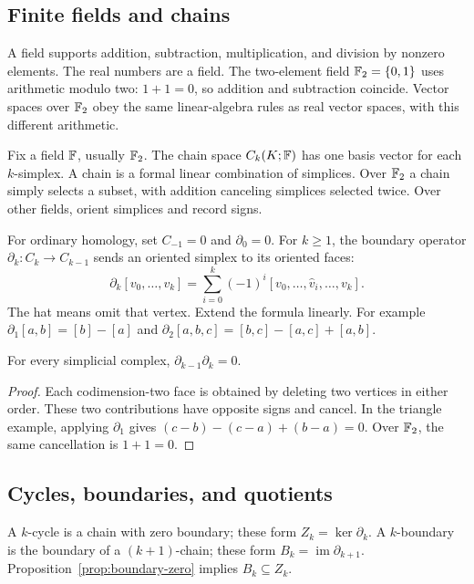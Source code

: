 \subsection{Finite fields and chains}
A field supports addition, subtraction, multiplication, and division by nonzero elements. The real numbers are a field. The two-element field $\mathbb{F}_2=\{0,1\}$ uses arithmetic modulo two: $1+1=0$, so addition and subtraction coincide. Vector spaces over $\mathbb{F}_2$ obey the same linear-algebra rules as real vector spaces, with this different arithmetic.

Fix a field $\mathbb{F}$, usually $\mathbb{F}_2$. The chain space $C_k(K;\mathbb{F})$ has one basis vector for each $k$-simplex. A chain is a formal linear combination of simplices. Over $\mathbb{F}_2$ a chain simply selects a subset, with addition canceling simplices selected twice. Over other fields, orient simplices and record signs.

For ordinary homology, set $C_{-1}=0$ and $\partial_0=0$. For $k\geq1$, the boundary operator $\partial_k:C_k\to C_{k-1}$ sends an oriented simplex to its oriented faces:
\begin{equation}\label{eq:boundary}
\partial_k[v_0,\ldots,v_k]=\sum_{i=0}^k(-1)^i[v_0,\ldots,\widehat v_i,\ldots,v_k].
\end{equation}
The hat means omit that vertex. Extend the formula linearly. For example $\partial_1[a,b]=[b]-[a]$ and $\partial_2[a,b,c]=[b,c]-[a,c]+[a,b]$.

\begin{proposition}\label{prop:boundary-zero}
For every simplicial complex, $\partial_{k-1}\partial_k=0$.
\end{proposition}
\begin{proof}
Each codimension-two face is obtained by deleting two vertices in either order. These two contributions have opposite signs and cancel. In the triangle example, applying $\partial_1$ gives $(c-b)-(c-a)+(b-a)=0$. Over $\mathbb{F}_2$, the same cancellation is $1+1=0$.
\end{proof}

\subsection{Cycles, boundaries, and quotients}
A $k$-cycle is a chain with zero boundary; these form $Z_k=\ker\partial_k$. A $k$-boundary is the boundary of a $(k+1)$-chain; these form $B_k=\operatorname{im}\partial_{k+1}$. Proposition~\ref{prop:boundary-zero} implies $B_k\subseteq Z_k$.

